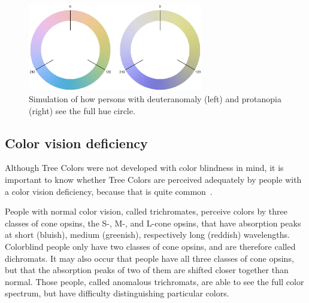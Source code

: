 \documentclass[journal]{vgtc}                %
\begin{document}
\begin{figure}[!b]
  \centering
 \includegraphics[width=3in]{hcl_deuteranomaly_protanopia.png}
  \caption{Simulation of how persons with deuteranomaly (left) and protanopia (right) see the full hue circle.}\label{fig:colblind}
\end{figure}

\subsection{Color vision deficiency}
Although Tree Colors were not developed with color blindness in mind, it is important to know whether Tree Colors are 
perceived adequately by people with a color vision deficiency, because that is quite common~\cite{birch12}.

People with normal color vision, called trichromates, perceive colors by three classes of cone opsins, the S-, M-, 
and L-cone opsins, that have absorption peaks at short (bluish), medium (greenish),  respectively long (reddish) wavelengths. Colorblind people only have two classes of cone opsins, and are therefore called dichromats. It may also occur that people have all three classes of cone opsins, but that the absorption peaks of two of them are shifted closer together than normal. Those people, called anomalous trichromats, are able to see the full color spectrum, but have difficulty distinguishing particular colors.

\end{document}
